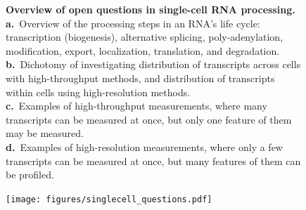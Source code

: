 \clearpage
\thispagestyle{facingcaption}
\begin{figure}[h]
\captionsetup{labelformat=prev-page}
\caption[Overview of open questions in single-cell RNA processing.]{\textbf{Overview of open questions in single-cell RNA processing.}\\
\textbf{a.}~Overview of the processing steps in an RNA's life cycle: transcription (biogenesis), alternative splicing, poly-adenylation, modification, export, localization, translation, and degradation.\\
\textbf{b.}~Dichotomy of investigating distribution of transcripts across cells with high-throughput methods, and distribution of transcripts within cells using high-resolution methods.\\
\textbf{c.}~Examples of high-throughput measurements, where many transcripts can be measured at once, but only one feature of them may be measured.\\
\textbf{d.}~Examples of high-resolution measurements, where only a few transcripts can be measured at once, but many features of them can be profiled.
}
\label{fig:singlecell_questions}
\end{figure}
\clearpage
\begin{figure}[h]
\ContinuedFloat
\captionsetup{labelformat=empty}
\centering
\texttt{[image: figures/singlecell\_questions.pdf]}
\end{figure}
\clearpage



